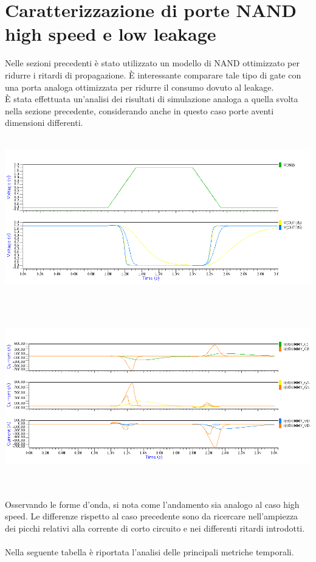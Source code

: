 \documentclass[11pt,  english, makeidx, a4paper, titlepage, oneside]{book}
\begin{document}
\section{Caratterizzazione di porte NAND high speed e low leakage}
Nelle sezioni precedenti è stato utilizzato un modello di NAND ottimizzato per ridurre i ritardi di propagazione. È interessante comparare tale tipo di gate con una porta analoga ottimizzata per ridurre il consumo dovuto al leakage.
\\
È stata effettuata un'analisi dei risultati di simulazione analoga a quella svolta nella sezione precedente, considerando anche in questo caso porte aventi dimensioni differenti.
\\\\
\centerline{\includegraphics[width=14cm]{./img/Lab_5/waveform_6.png}}
\\\\
\centerline{\includegraphics[width=14cm]{./img/Lab_5/waveform_7.png}}
\\\\
Osservando le forme d'onda, si nota come l'andamento sia analogo al caso high speed. Le differenze rispetto al caso precedente sono da ricercare nell'ampiezza dei picchi relativi alla corrente di corto circuito e nei differenti ritardi introdotti.
\\\\
Nella seguente tabella è riportata l'analisi delle principali metriche temporali.
\end{document}
